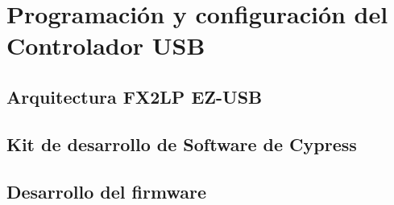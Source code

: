 \chapter{Programación y configuración del Controlador USB}
	\section{Arquitectura FX2LP EZ-USB}
		
	\section{Kit de desarrollo de Software de Cypress}
		
	\section{Desarrollo del firmware}
		